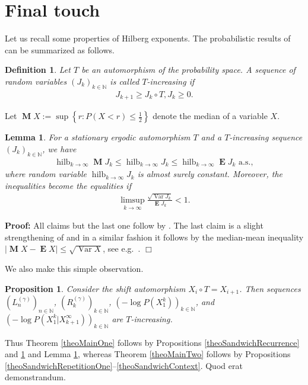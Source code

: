 \documentclass[a4paper,12pt]{article}
\newcommand{\abs}[1]{\left| #1 \right|}
\newcommand{\klam}[1]{\left\{ #1 \right\}}
\DeclareMathOperator*{\hilberg}{hilb}
\DeclareMathOperator{\var}{Var}
\DeclareMathOperator{\mean}{\mathbf{E}}
\DeclareMathOperator{\median}{\mathbf{M}}
\newtheorem{definition}{Definition}
\newtheorem{proposition}{Proposition}
\newtheorem{lemma}{Lemma}
\newenvironment*{proof}{\begin{trivlist}\item[]
\noindent\textbf{Proof:}}{$\Box$\par\end{trivlist}}
\begin{document}
\section{Final touch}
\label{secFinal}

Let us recall some properties of Hilberg exponents.  The probabilistic
results of \citep[Section 8.1]{Debowski21} can be summarized as
follows.
\begin{definition}
  Let $T$ be an automorphism of the probability space.  A sequence of
  random variables $(J_k)_{k\in\mathbb{N}}$ is called $T$-increasing
  if
  \begin{align}
    J_{k+1}\ge J_k\circ T,J_k\ge 0.
  \end{align}
\end{definition}
Let $\median X:=\sup \klam{r: P(X<r)\le \frac{1}{2}}$ denote the
median of a variable $X$.
\begin{lemma}
  \label{theoHilberg}
  For a stationary ergodic automorphism $T$ and a $T$-increasing
  sequence $(J_k)_{k\in\mathbb{N}}$, we have
  \begin{align}
    \hilberg_{k\rightarrow\infty} \median J_k
    \le \hilberg_{k\rightarrow\infty} J_k 
    \le \hilberg_{k\rightarrow\infty} \mean J_k
    \text{ a.s.}, 
  \end{align}
  where random variable $\hilberg_{k\rightarrow\infty} J_k$ is almost
  surely constant. Moreover, the inequalities become the equalities if
  \begin{align}
    \limsup_{k\rightarrow\infty} \frac{\sqrt{\var J_k}}{\mean J_k}<1.
  \end{align}
\end{lemma}
\begin{proof}
  All claims but the last one follow by \citep[Theorems 8.3--8.5]{Debowski21}.
  The last claim is a slight strengthening of \citep[Theorem
  8.6]{Debowski21} and in a similar fashion it follows by the
  median-mean inequality $\abs{\median X-\mean X}\le \sqrt{\var X}$,
  see e.g.\ \citep[Theorem 3.17]{Debowski21}.
\end{proof}

We also make this simple observation.
\begin{proposition}
  \label{theoIncreasing}
  Consider the shift automorphism $X_i\circ T=X_{i+1}$. Then sequences
  $(L^{(\gamma)}_n)_{n\in\mathbb{N}}$,
  $(R^{(\gamma)}_k)_{k\in\mathbb{N}}$,
  $(-\log P(X_1^k))_{k\in\mathbb{N}}$, and
  $(-\log P(X_1^k|X_{k+1}^\infty))_{k\in\mathbb{N}}$ are
  $T$-increasing.
\end{proposition}
Thus Theorem \ref{theoMainOne} follows by Propositions
\ref{theoSandwichRecurrence} and \ref{theoIncreasing} and Lemma
\ref{theoHilberg}, whereas Theorem \ref{theoMainTwo} follows by
Propositions
\ref{theoSandwichRepetitionOne}--\ref{theoSandwichContext}. Quod erat
demonstrandum.

% 

%


\end{document}
